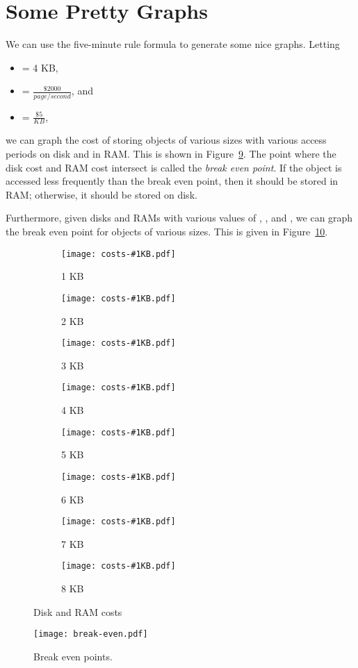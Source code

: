 \documentclass[12pt]{article}
\newcommand{\figref}[1]{Figure~\ref{fig:#1}}
\begin{document}
\section{Some Pretty Graphs}\label{sec:graphs}
We can use the five-minute rule formula to generate some nice graphs. Letting
\begin{itemize}
  \item \pagesize{} = 4 KB,
  \item \accessprice{} = $\frac{\$2000}{page/second}$, and
  \item \ramprice{} = $\frac{\$5}{KB}$,
\end{itemize}
we can graph the cost of storing objects of various sizes with various access
periods on disk and in RAM. This is shown in \figref{costs}. The point where
the disk cost and RAM cost intersect is called the \emph{break even point}. If
the object is accessed less frequently than the break even point, then it
should be stored in RAM; otherwise, it should be stored on disk.

Furthermore, given disks and RAMs with various values of \pagesize{},
\accessprice{}, and \ramprice{}, we can graph the break even point for objects
of various sizes. This is given in \figref{break-even}.

\begin{figure}
  \centering

  \newcommand{\costs}[2]{
    \begin{subfigure}[b]{0.32\textwidth}
      \centering
      \texttt{[image: costs-\#1KB.pdf]}
      \caption{#2}
      \label{fig:costs-#1}
    \end{subfigure}%
  }

  \costs{01}{1 KB}
  \costs{02}{2 KB}
  \costs{03}{3 KB}

  \costs{04}{4 KB}
  \costs{05}{5 KB}
  \costs{06}{6 KB}

  \costs{07}{7 KB}
  \costs{08}{8 KB}

  \caption{Disk and RAM costs}
  \label{fig:costs}
\end{figure}

\begin{figure}
  \centering
  \texttt{[image: break-even.pdf]}
  \caption{Break even points.}
  \label{fig:break-even}
\end{figure}



\end{document}
